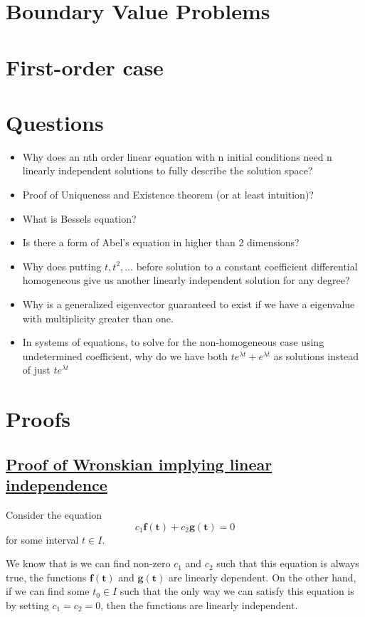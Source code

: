 \documentclass{report}
\begin{document}
{\chapter{Boundary Value Problems}

\chapter{First-order case}

\chapter{Questions}
\begin{itemize}
    \item Why does an nth order linear equation with n initial conditions need n linearly independent solutions to fully describe the solution space?
    \item Proof of Uniqueness and Existence theorem (or at least intuition)?
    \item What is Bessels equation?
    \item Is there a form of Abel's equation in higher than 2 dimensions?
    \item Why does putting $t, t^2, \dots $ before solution to a constant coefficient differential homogeneous give us another linearly independent solution for any degree?
    \item Why is a generalized eigenvector guaranteed to exist if we have a eigenvalue with multiplicity greater than one.
    \item In systems of equations, to solve for the non-homogeneous case using undetermined coefficient, why do we have both $te^{\lambda t} + e^{\lambda t}$ as solutions instead of just $te^{\lambda t}$
\end{itemize}

\chapter{Proofs}
\section{\hyperref[th:wronLinInd]{Proof of Wronskian implying linear independence}}
\label{sec:prWronLinInd}
Consider the equation 
$$c_1\bm{f(t)} + c_2\bm{g(t)} = 0$$ 
for some interval $t \in I$. 

We know that is we can find non-zero $c_1$ and $c_2$ such that this equation is always true, the functions $\bm{f(t)}$ and $\bm{g(t)}$ are linearly dependent. On the other hand, if we can find some $t_0 \in I$ such that the only way we can satisfy this equation is by setting $c_1 = c_2 = 0$, then the functions are linearly independent.

}
\end{document}
